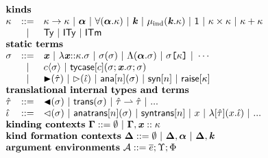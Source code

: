 $\begin{array}{lcl}%
\multicolumn{3}{>{$}l<{$}}{\textbf{kinds}}\\
\kappa & ::= & %
\karrow{\kappa}{\kappa} ~|~%
\kalpha ~|~%
\kforall{\kalpha}{\kappa} ~|~%
\kvar ~|~%
\kmu{\kvar}{\kappa} ~|~%
\kunit ~|~%
\kprod{\kappa}{\kappa} ~|~%
\ksum{\kappa}{\kappa}\\
&~|~&\kty ~|~%
\kity ~|~%
\kitm \\
\multicolumn{3}{l}{\textbf{static terms}}\\
\st & ::= & %
\sx ~|~%
\slam{\kappa}{\sx}{\st} ~|~%
\sap{\st}{\st} ~|~%
\sLam{\kalpha}{\st} ~|~%
\skap{\kappa}{\st} ~|~
\cdots\\
&~|~&\sty{c}{\st} ~|~%
\stycase{c}{\st}{\sx}{\st}{\st}\\
&~|~&\sqity{\qity}  ~|~%
\sqitm{\qitm} ~|~%
{\technical{\sana{n}{\st}}} ~|~%
{\technical{\ssyn{n}}} ~|~%
\sraise{\kappa} \\
\multicolumn{3}{l}{\textbf{translational internal types and terms}}\\
\qity & ::= & \quqty{\st} ~|~ \srep{\st} ~|~ \iparr{\qity}{\qity} ~|~ ...\\
\qitm & ::= & \quqtm{\st} ~|~ \anatrans{n}{\st} ~|~ \syntrans{n} ~|~ x ~|~ \ilam{\qity}{x}{\qitm} ~|~ ... \\
\multicolumn{3}{l}{\textbf{kinding contexts}~\kGamma ::= \emptyset ~|~ \kGamma, \sx :: \kappa}\\
\multicolumn{3}{l}{\textbf{kind formation contexts}~\kDelta ::= \emptyset ~|~ \kDelta, \kalpha ~|~ \kDelta, \kvar}\\
\multicolumn{3}{l}{\textbf{argument environments}~\argEnv ::= \es; \Upsilon; \Phi}\\
\end{array}%
$